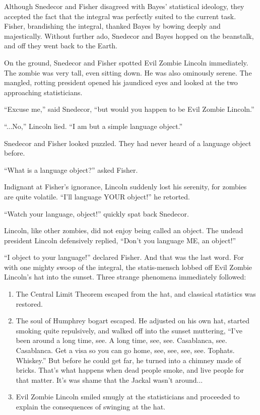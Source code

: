 \documentclass{article}
\begin{document}
Although Snedecor and Fisher disagreed with Bayes' statistical ideology, they accepted the fact that the integral was perfectly suited to the current task. Fisher, brandishing the integral, thanked Bayes by bowing deeply and majestically. Without further ado, Snedecor and Bayes hopped on the beanstalk, and off they went back to the Earth.  


On the ground, Snedecor and Fisher spotted Evil Zombie Lincoln immediately. The zombie was very tall, even sitting down. He was also ominously serene. The mangled, rotting president opened his jaundiced eyes and looked at the two approaching statisticians. 

``Excuse me,'' said Snedecor, ``but would you happen to be Evil Zombie Lincoln.'' 

``...No,'' Lincoln lied. ``I am but a simple language object.'' 

Snedecor and Fisher looked puzzled. They had never heard of a language object before. 

``What is a language object?'' asked Fisher. 

Indignant at Fisher's ignorance, Lincoln suddenly lost his serenity, for zombies are quite volatile. ``I'll language YOUR object!'' he retorted. 

``Watch your language, object!'' quickly spat back Snedecor. 

Lincoln, like other zombies, did not enjoy being called an object. The undead president Lincoln defensively replied, ``Don't you language ME, an object!'' 

``I object to your language!'' declared Fisher. And that was the last word. For with one mighty swoop of the integral, the statis-mensch lobbed off Evil Zombie Lincoln's hat into the sunset. Three strange phenomena immediately followed: 

\begin{enumerate}
\item The Central Limit Theorem escaped from the hat, and classical statistics was restored.
\item The soul of Humphrey bogart escaped. He adjusted on his own hat, started smoking quite repulsively, and walked off into the sunset muttering, ``I've been around a long time, see. A long time, see, see. Casablanca, see. Casablanca. Get a visa so you can go home, see, see, see, see. Tophats. Whiskey.'' But before he could get far, he turned into a chimney made of bricks. That's what happens when dead people smoke, and live people for that matter. It's was shame that the Jackal wasn't around...
\item Evil Zombie Lincoln smiled smugly at the statisticians and proceeded to explain the consequences of swinging at the hat.
\end{enumerate}
\end{document}
